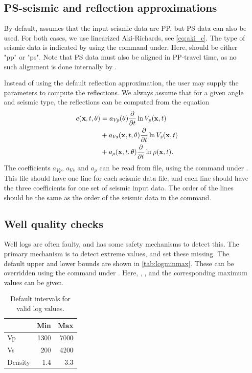 \subsection{PS-seismic and reflection approximations}
By default, \crava assumes that the input seismic data are PP, but PS data can also be used. For both cases, we use  linearized Aki-Richards, see \autoref{eq:aki_c}. The type of seismic data is indicated by using the  command under. Here,  should be either "pp" or "ps". Note that PS data must also be aligned in PP-travel time, as no such alignment is done internally by \crava.

Instead of using the default reflection approximation, the user may supply the parameters to compute the reflections. We always assume that for a given angle and seismic type, the reflections can be computed from the equation
\begin{equation}
\begin{split}
  c(\mathbf{x},t,\theta)
  & = a_{V\!p} (\theta) \frac{\partial}{\partial t}\ln V_p (\mathbf{x},t)\\
  & + a_{V\!s} (\mathbf{x},t,\theta) \frac{\partial}{\partial t}\ln V_s (\mathbf{x},t)\\
  & + a_\rho(\mathbf{x},t,\theta) \frac{\partial}{\partial t}\ln\rho(\mathbf{x},t).
\label{eq:linrefl}
\end{split}
\end{equation}
The coefficients $a_{V\!p}$, $a_{V\!s}$ and $a_\rho$ can be read from file, using the  command under . This file should have one line for each seismic data file, and each line should have the three coefficients for one set of seismic input data. The order of the lines should be the same as the order of the seismic data in the  command.

\subsection{Well quality checks}
Well logs are often faulty, and \crava has some safety mechanisms to detect this. The primary mechanism is to detect extreme values, and set these missing. The default upper and lower bounds are shown in \autoref{tab:logminmax}. These can be overridden using the command  under . Here, , ,  and the corresponding maximum values can be given.
\begin{table}
\begin{tabular}{|lrr|}
\hline
& Min & Max \\
\hline
Vp & 1300 & 7000 \\
Vs &  200 & 4200 \\
Density & 1.4 & 3.3
\end{tabular}
\caption{Default intervals for valid log values.\label{tab:logminmax}}
\end{table}


